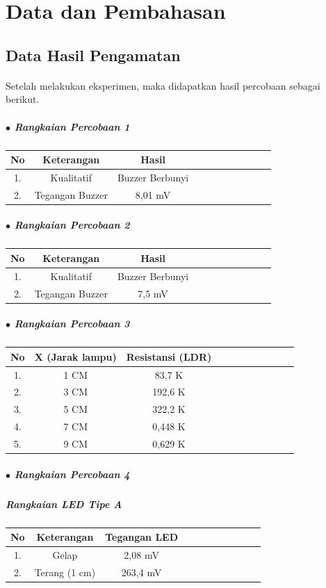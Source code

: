 \documentclass[12pt,a4paper]{article}
\begin{document}
\newpage

\section{Data dan Pembahasan}

\subsection{Data Hasil Pengamatan}
\paragraph{ } Setelah melakukan eksperimen, maka didapatkan hasil percobaan sebagai berikut.

\subparagraph*{$\bullet$ Rangkaian Percobaan 1 }
\subparagraph*{ }
\begin{tabular}{|c|c|c|c|c|c|c|c|c|c|c|}        \hline
No & Keterangan       & Hasil            \\ \hline 
1. & Kualitatif       & Buzzer Berbunyi  \\ \hline
2. & Tegangan Buzzer  & 8,01 mV          \\ \hline
 \end{tabular}
 
\subparagraph*{$\bullet$ Rangkaian Percobaan 2 }
\subparagraph*{ }
\begin{tabular}{|c|c|c|c|c|c|c|c|c|c|c|}        \hline
No & Keterangan       & Hasil            \\ \hline 
1. & Kualitatif       & Buzzer Berbunyi  \\ \hline
2. & Tegangan Buzzer  & 7,5 mV           \\ \hline
 \end{tabular}

\subparagraph*{$\bullet$ Rangkaian Percobaan 3 }
\subparagraph*{ }
\begin{tabular}{|c|c|c|c|c|c|c|c|c|c|c|}        \hline
No & X (Jarak lampu) & Resistansi (LDR)    \\ \hline 
1. & 1 CM       & 83,7  K  \\ \hline
2. & 3 CM       & 192,6 K  \\ \hline
3. & 5 CM       & 322,2 K  \\ \hline
4. & 7 CM       & 0,448 K  \\ \hline
5. & 9 CM       & 0,629 K  \\ \hline
 \end{tabular}
\subparagraph*{$\bullet$ Rangkaian Percobaan 4 }
\subparagraph*{ Rangkaian LED Tipe A}
\begin{tabular}{|c|c|c|c|c|c|c|c|c|c|c|}        \hline
No & Keterangan     & Tegangan LED   \\ \hline 
1. & Gelap          & 2,08  mV       \\ \hline
2. & Terang (1 cm)  & 263,4 mV       \\ \hline
 \end{tabular}
\end{document}
